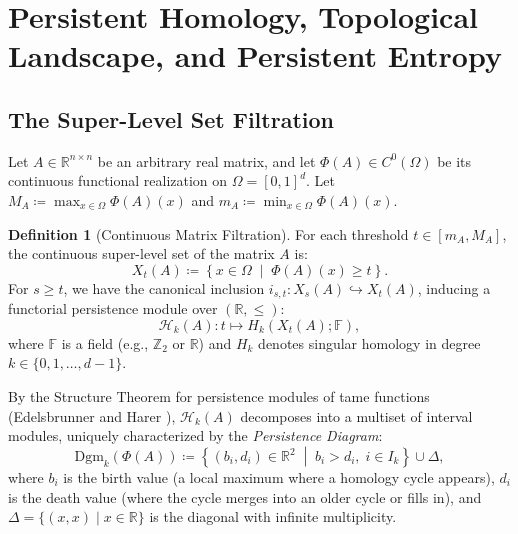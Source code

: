 \documentclass[11pt,a4paper,reqno]{amsart}
\theoremstyle{definition}
\newtheorem{definition}[theorem]{Definition}
\numberwithin{equation}{section}
\newcommand{\R}{\mathbb{R}}
\begin{document}
\section{Persistent Homology, Topological Landscape, and Persistent Entropy}
\label{sec:persistent_homology}

\subsection{The Super-Level Set Filtration}
Let $A \in \R^{n \times n}$ be an arbitrary real matrix, and let $\Phi(A) \in C^0(\Omega)$ be its continuous functional realization on $\Omega = [0, 1]^d$. Let $M_A \coloneqq \max_{x \in \Omega} \Phi(A)(x)$ and $m_A \coloneqq \min_{x \in \Omega} \Phi(A)(x)$.

\begin{definition}[Continuous Matrix Filtration]
For each threshold $t \in [m_A, M_A]$, the continuous super-level set of the matrix $A$ is:
\begin{equation}
    X_t(A) \coloneqq \left\{ x \in \Omega \;\middle|\; \Phi(A)(x) \ge t \right\}.
\end{equation}
For $s \ge t$, we have the canonical inclusion $i_{s,t} \colon X_s(A) \hookrightarrow X_t(A)$, inducing a functorial persistence module over $(\R, \le)$:
\begin{equation}
    \mathcal{H}_k(A) \colon t \longmapsto H_k(X_t(A); \mathbb{F}),
\end{equation}
where $\mathbb{F}$ is a field (e.g., $\mathbb{Z}_2$ or $\R$) and $H_k$ denotes singular homology in degree $k \in \{0, 1, \dots, d-1\}$.
\end{definition}

By the Structure Theorem for persistence modules of tame functions (Edelsbrunner and Harer \cite{edelsbrunner2010computational}), $\mathcal{H}_k(A)$ decomposes into a multiset of interval modules, uniquely characterized by the \emph{Persistence Diagram}:
\begin{equation}
    \mathrm{Dgm}_k(\Phi(A)) \coloneqq \left\{ (b_i, d_i) \in \R^2 \;\middle|\; b_i > d_i, \; i \in I_k \right\} \cup \Delta,
\end{equation}
where $b_i$ is the birth value (a local maximum where a homology cycle appears), $d_i$ is the death value (where the cycle merges into an older cycle or fills in), and $\Delta = \{(x, x) \mid x \in \R\}$ is the diagonal with infinite multiplicity.
\end{document}
